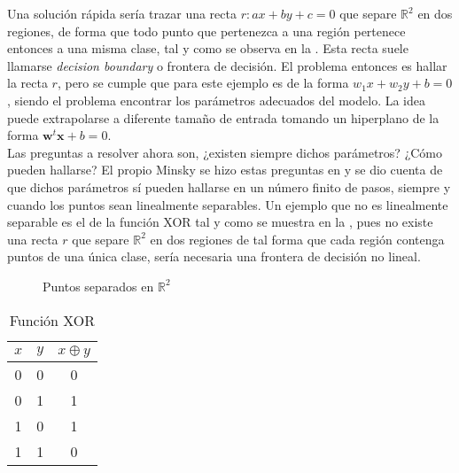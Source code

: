 		Una solución rápida sería trazar una recta $r: ax + by + c = 0$ que separe $\mathbb{R}^2$ en dos regiones, de forma que todo punto que pertenezca a una región pertenece entonces a una misma clase, tal y como se observa en la . Esta recta suele llamarse \textit{decision boundary} o frontera de decisión. El problema entonces es hallar la recta $r$, pero se cumple que para este ejemplo es de la forma $w_1 x + w_2 y + b = 0$, siendo el problema encontrar los parámetros adecuados del modelo. La idea puede extrapolarse a diferente tamaño de entrada tomando un hiperplano de la forma $\textbf{w}^t \textbf{x} + b = 0$. \\
		
		Las preguntas a resolver ahora son, ¿existen siempre dichos parámetros? ¿Cómo pueden hallarse? El propio Minsky se hizo estas preguntas en \cite{perceptrons} y se dio cuenta de que dichos parámetros sí pueden hallarse en un número finito de pasos, siempre y cuando los puntos sean linealmente separables. Un ejemplo que no es linealmente separable es el de la función XOR tal y como se muestra en la , pues no existe una recta $r$ que separe $\mathbb{R}^2$ en dos regiones de tal forma que cada región contenga puntos de una única clase, sería necesaria una frontera de decisión no lineal. 
		
		\begin{figure}
			\centering
			\caption{Puntos separados en $\mathbb{R}^2$}
			\label{fig:separated_label_data}
		\end{figure}
		
		\begin{table}[H]
			\centering
			\begin{tabular}{|c|c|c|}\hline
				$x$ & $y$ & $x \oplus y$\\\hline
				0 & 0 & 0\\\hline
				0 & 1 & 1\\\hline
				1 & 0 & 1\\\hline
				1 & 1 & 0\\\hline
			\end{tabular}
			\caption{Función XOR}
			\label{table:xor}
		\end{table}
		
